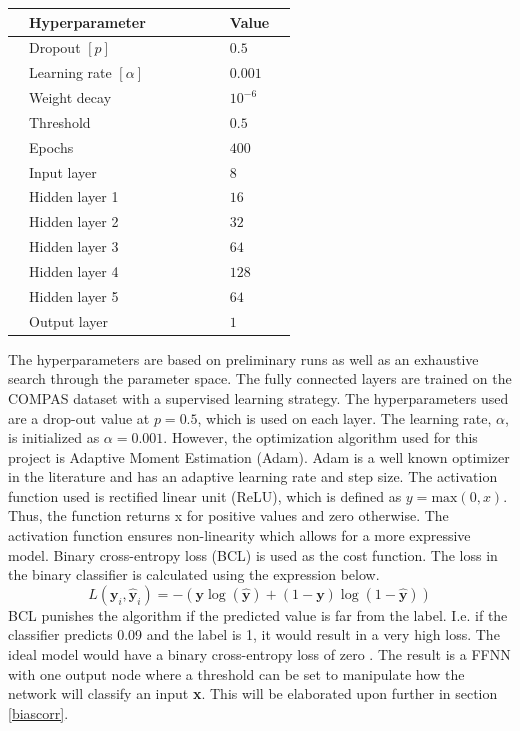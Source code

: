\documentclass[11pt, fleqn, titlepage]{article}
\begin{document}
	\begin{table}[H]
		\centering
		\begin{tabular}{l l l l l l l l l}
			\toprule
			& Hyperparameter           &&&&& & Value    & \\ \midrule
			& Dropout $[p]$            &&&&& & $0.5$    & \\ 
			& Learning rate $[\alpha]$ &&&&& & $0.001$  & \\ 
			& Weight decay             &&&&& & $10^{-6}$& \\ 
			& Threshold                &&&&& & $0.5$    & \\ 
			& Epochs                   &&&&& & $400$    & \\ 
			& Input layer              &&&&& & $8$      & \\ 
			& Hidden layer 1           &&&&& & $16$     & \\ 
			& Hidden layer 2           &&&&& & $32$     & \\ 
			& Hidden layer 3           &&&&& & $64$     & \\ 
			& Hidden layer 4           &&&&& & $128$    & \\ 
			& Hidden layer 5           &&&&& & $64$     & \\ 
			& Output layer             &&&&& & $1$      & \\ \bottomrule
		\end{tabular}
	\end{table}
	\noindent
	The hyperparameters are based on preliminary runs as well as an exhaustive search through the parameter space. The fully connected layers are trained on the COMPAS dataset with a supervised learning strategy. The hyperparameters used are a drop-out value at $p=0.5$, which is used on each layer. The learning rate, $\alpha$, is initialized as $\alpha = 0.001$. However, the optimization algorithm used for this project is Adaptive Moment Estimation (Adam). Adam is a well known optimizer in the literature and has an adaptive learning rate and step size. The activation function used is rectified linear unit (ReLU), which is defined as $ y = \text{max}(0,x) $. Thus, the function returns x for positive values and zero otherwise. The activation function ensures non-linearity which allows for a more expressive model. Binary cross-entropy loss (BCL) is used as the cost function. The loss in the binary classifier is calculated using the expression below. 
	\begin{equation}\label{key}
	L\left(\boldsymbol{y}_{i}, \hat{\boldsymbol{y}}_{i}\right) = -(\mathbf y \log (\mathbf {\hat y})+(1-\mathbf  y) \log (1-\mathbf {\hat y}))
	\end{equation}
	BCL punishes the algorithm if the predicted value is far from the label. I.e. if the classifier predicts 0.09 and the label is 1, it would result in a very high loss. The ideal model would have a binary cross-entropy loss of zero \cite {dl}. The result is a FFNN with one output node where a threshold can be set to manipulate how the network will classify an input \textbf{x}. This will be elaborated upon further in section \ref{biascorr}.
\end{document}

